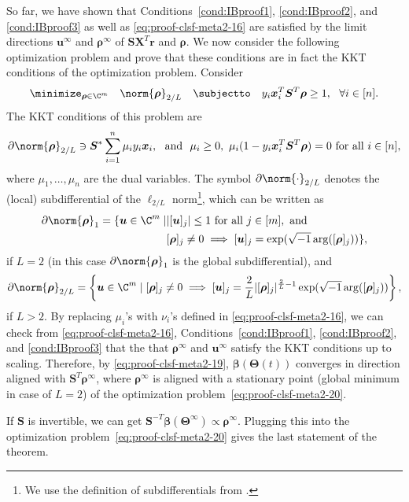 \documentclass{article} %
\def\vr{{\bm{r}}}
\def\vu{{\bm{u}}}
\def\vx{{\bm{x}}}
\def\mS{{\bm{S}}}
\def\mX{{\bm{X}}}
\newcommand{\vbeta}{{\bm{\beta}}}
\newcommand{\bTheta}{\bm{\Theta}}
\newcommand{\vrho}{{\bm{\rho}}}
\newcommand{\Arg}{\mathop{\rm arg}}
\begin{document}
So far, we have shown that Conditions~\ref{cond:IBproof1}, \ref{cond:IBproof2}, and \ref{cond:IBproof3} as well as \eqref{eq:proof-clsf-meta2-16} are satisfied by the limit directions $\vu^\infty$ and $\vrho^\infty$ of $\mS \mX^T \vr$ and $\vrho$. We now consider the following optimization problem and prove that these conditions are in fact the KKT conditions of the optimization problem.
Consider 
\begin{equation}
	\label{eq:proof-clsf-meta2-20}
	\minimize_{\vrho \in \C^m}\quad \norm{\vrho}_{2/L}
	\quad
	\subjectto \quad y_i \vx_i^T\mS^T \vrho \geq 1,~~\forall i\in[n].
\end{equation}
The KKT conditions of this problem are
\begin{equation*}
	\partial \norm{\vrho}_{2/L} \ni \mS^* \sum_{i=1}^n \mu_i y_i \vx_i,~\text{ and }~\mu_i \geq 0,~ \mu_i(1-y_i\vx_i^T \mS^T \vrho) = 0 \text{ for all } i \in [n],
\end{equation*}
where $\mu_1, \dots, \mu_n$ are the dual variables.
The symbol $\partial \norm{\cdot}_{2/L}$ denotes the (local) subdifferential of the $\ell_{2/L}$ norm\footnote{We use the definition of subdifferentials from \citet{gunasekar2018implicit}.}, which can be written as
\begin{align*}
	\partial \norm{\vrho}_{1}
	=
	\{ \vu \in \C^m \mid &|[\vu]_j| \leq 1 \text{ for all } j \in [m], \text{ and }\\ &[\vrho]_j \neq 0 \implies [\vu]_j = \exp(\sqrt{-1} \Arg([\vrho]_j))\},
\end{align*}
if $L = 2$ (in this case $\partial \norm{\vrho}_{1}$ is the global subdifferential), and
\begin{equation*}
	\partial \norm{\vrho}_{2/L}
	=
	\left \{ \vu \in \C^m \mid [\vrho]_j \neq 0 \implies [\vu]_j = \frac{2}{L} |[\vrho]_j|^{\frac{2}{L}-1} \exp(\sqrt{-1} \Arg([\vrho]_j)) \right \}, 
\end{equation*}
if $L > 2$.
By replacing $\mu_i$'s with $\nu_i$'s defined in \eqref{eq:proof-clsf-meta2-16}, we can check from \eqref{eq:proof-clsf-meta2-16}, Conditions~\ref{cond:IBproof1}, \ref{cond:IBproof2}, and \ref{cond:IBproof3} that the that $\vrho^\infty$ and $\vu^\infty$ satisfy the KKT conditions up to scaling. 
Therefore, by \eqref{eq:proof-clsf-meta2-19}, $\vbeta(\bTheta(t))$ converges in direction aligned with $\mS^T \vrho^{\infty}$, where $\vrho^\infty$ is aligned with a stationary point (global minimum in case of $L=2$) of the optimization problem~\eqref{eq:proof-clsf-meta2-20}.

If $\mS$ is invertible, we can get $\mS^{-T} \vbeta(\bTheta^\infty) \propto \vrho^\infty$. Plugging this into the optimization problem~\eqref{eq:proof-clsf-meta2-20} gives the last statement of the theorem.
\end{document}
